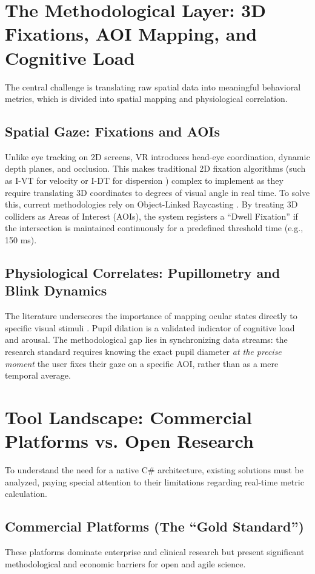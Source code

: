 \documentclass[12pt,a4paper]{article}
\begin{document}
\section{The Methodological Layer: 3D Fixations, AOI Mapping, and Cognitive Load}

The central challenge is translating raw spatial data into meaningful behavioral metrics, which is divided into spatial mapping and physiological correlation.

\subsection{Spatial Gaze: Fixations and AOIs}
Unlike eye tracking on 2D screens, VR introduces head-eye coordination, dynamic depth planes, and occlusion. This makes traditional 2D fixation algorithms (such as I-VT for velocity or I-DT for dispersion \cite{salvucci2000}) complex to implement as they require translating 3D coordinates to degrees of visual angle in real time. To solve this, current methodologies rely on Object-Linked Raycasting \cite{duchowski2017}. By treating 3D colliders as Areas of Interest (AOIs), the system registers a ``Dwell Fixation'' if the intersection is maintained continuously for a predefined threshold time (e.g., 150 ms).

\subsection{Physiological Correlates: Pupillometry and Blink Dynamics}
The literature underscores the importance of mapping ocular states directly to specific visual stimuli \cite{eckstein2017}. Pupil dilation is a validated indicator of cognitive load and arousal. The methodological gap lies in synchronizing data streams: the research standard requires knowing the exact pupil diameter \textit{at the precise moment} the user fixes their gaze on a specific AOI, rather than as a mere temporal average.

\section{Tool Landscape: Commercial Platforms vs. Open Research}

To understand the need for a native C\# architecture, existing solutions must be analyzed, paying special attention to their limitations regarding real-time metric calculation.

\subsection{Commercial Platforms (The ``Gold Standard'')}
These platforms dominate enterprise and clinical research but present significant methodological and economic barriers for open and agile science.
\end{document}
